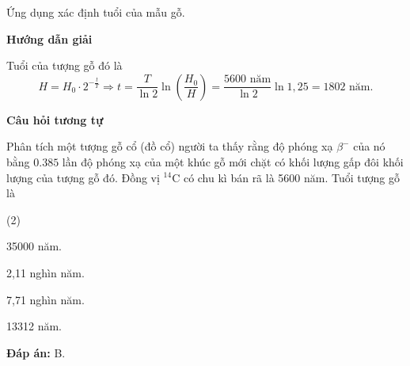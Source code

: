 	\begin{dang}{Ứng dụng xác định tuổi của mẫu gỗ.}
		
		
		{\begin{center}
			\textbf{Hướng dẫn giải}
		\end{center}
		
		Tuổi của tượng gỗ đó là
		\begin{equation*}
		H=H_0\cdot 2^{-\frac{t}{T}}\Rightarrow t=\dfrac{T}{\ln2}\ln \left(\dfrac{H_0}{H}\right)=\dfrac{\textrm{5600 năm}}{\ln2}\ln 1,25=\textrm{1802 năm}.
		\end{equation*}
		
		\begin{center}
			\textbf{Câu hỏi tương tự}
		\end{center}
		
Phân tích một tượng gỗ cổ (đồ cổ) người ta thấy rằng độ phóng xạ $ \beta^{-} $ của nó bằng $ \num{0,385} $ lần độ phóng xạ của một khúc gỗ mới chặt có khối lượng gấp đôi khối lượng của tượng gỗ đó. Đồng vị $ ^{14} \text{C} $ có chu kì bán rã là 5600 năm. Tuổi tượng gỗ là
\begin{mcq}(2)
	\item 35000 năm.
	\item 2,11 nghìn năm.
	\item 7,71 nghìn năm.
	\item 13312 năm.
\end{mcq}	
		
		\textbf{Đáp án:} B.}
	\end{dang}


